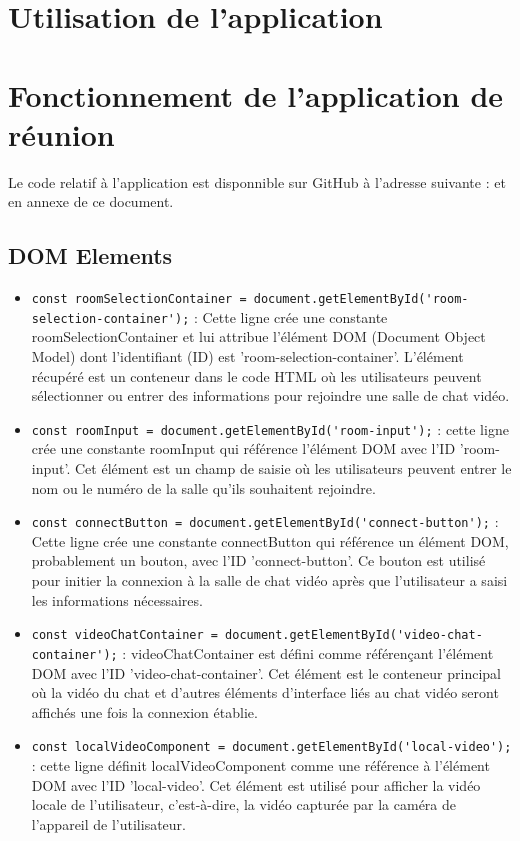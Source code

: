\documentclass[12pt, a4paper, oneside]{Thesis}
\begin{document}
\newpage

\section{Utilisation de l'application}

\newpage

\section{Fonctionnement de l'application de réunion}

Le code relatif à l'application est disponnible sur GitHub à l'adresse suivante : et en annexe de ce document.

\subsection{DOM Elements}

\begin{itemize}
  \item \verb|const roomSelectionContainer = document.getElementById('room-selection-container');| : Cette ligne crée une constante roomSelectionContainer et lui attribue l'élément DOM (Document Object Model) dont l'identifiant (ID) est 'room-selection-container'. L'élément récupéré est un conteneur dans le code HTML où les utilisateurs peuvent sélectionner ou entrer des informations pour rejoindre une salle de chat vidéo.
  \item \verb|const roomInput = document.getElementById('room-input');| : cette ligne crée une constante roomInput qui référence l'élément DOM avec l'ID 'room-input'. Cet élément est un champ de saisie où les utilisateurs peuvent entrer le nom ou le numéro de la salle qu'ils souhaitent rejoindre.
  \item \verb|const connectButton = document.getElementById('connect-button');| :  Cette ligne crée une constante connectButton qui référence un élément DOM, probablement un bouton, avec l'ID 'connect-button'. Ce bouton est utilisé pour initier la connexion à la salle de chat vidéo après que l'utilisateur a saisi les informations nécessaires.
  \item \verb|const videoChatContainer = document.getElementById('video-chat-container');| : videoChatContainer est défini comme référençant l'élément DOM avec l'ID 'video-chat-container'. Cet élément est le conteneur principal où la vidéo du chat et d'autres éléments d'interface liés au chat vidéo seront affichés une fois la connexion établie.
  \item \verb|const localVideoComponent = document.getElementById('local-video');| :  cette ligne définit localVideoComponent comme une référence à l'élément DOM avec l'ID 'local-video'. Cet élément est utilisé pour afficher la vidéo locale de l'utilisateur, c'est-à-dire, la vidéo capturée par la caméra de l'appareil de l'utilisateur.
\end{itemize}
\end{document}
